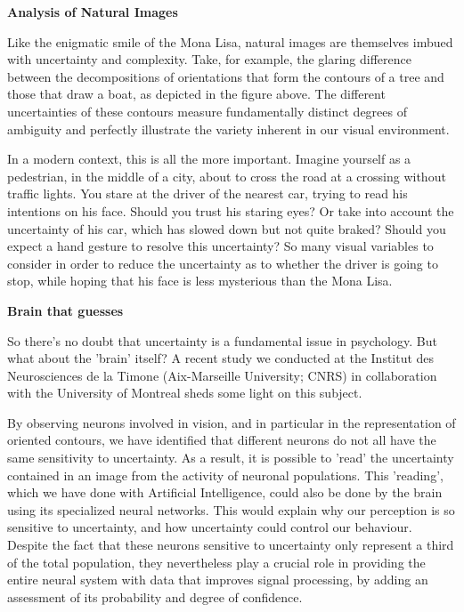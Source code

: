 \textbf{Analysis of Natural Images}

Like the enigmatic smile of the Mona Lisa, natural images are themselves imbued with uncertainty and complexity. Take, for example, the glaring difference between the decompositions of orientations that form the contours of a tree and those that draw a boat, as depicted in the figure above. The different uncertainties of these contours measure fundamentally distinct degrees of ambiguity and perfectly illustrate the variety inherent in our visual environment.

In a modern context, this is all the more important. Imagine yourself as a pedestrian, in the middle of a city, about to cross the road at a crossing without traffic lights. You stare at the driver of the nearest car, trying to read his intentions on his face. Should you trust his staring eyes? Or take into account the uncertainty of his car, which has slowed down but not quite braked? Should you expect a hand gesture to resolve this uncertainty? So many visual variables to consider in order to reduce the uncertainty as to whether the driver is going to stop, while hoping that his face is less mysterious than the Mona Lisa.

\textbf{Brain that guesses}

So there's no doubt that uncertainty is a fundamental issue in psychology. But what about the 'brain' itself? A recent study we conducted at the Institut des Neurosciences de la Timone (Aix-Marseille University; CNRS) in collaboration with the University of Montreal sheds some light on this subject.

By observing neurons involved in vision, and in particular in the representation of oriented contours, we have identified that different neurons do not all have the same sensitivity to uncertainty. As a result, it is possible to 'read' the uncertainty contained in an image from the activity of neuronal populations. This 'reading', which we have done with Artificial Intelligence, could also be done by the brain using its specialized neural networks. This would explain why our perception is so sensitive to uncertainty, and how uncertainty could control our behaviour. Despite the fact that these neurons sensitive to uncertainty only represent a third of the total population, they nevertheless play a crucial role in providing the entire neural system with data that improves signal processing, by adding an assessment of its probability and degree of confidence.


